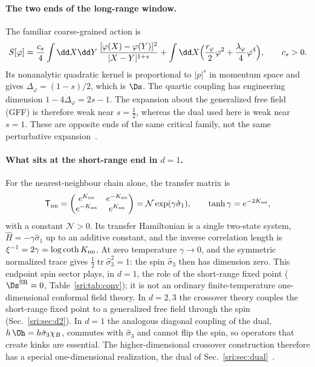 \paragraph{The two ends of the long-range window.} The familiar coarse-grained action is
\begin{equation}
 S[\varphi]=\frac{c_s}{4}\int\dd X\dd Y\,\frac{[\varphi(X)-\varphi(Y)]^2}{|X-Y|^{1+s}}
 +\int\dd X\Bigl(\frac{r_\varphi}{2}\varphi^2+\frac{\lambda_\varphi}{4}\varphi^4\Bigr),\qquad c_s>0.
\end{equation}
Its nonanalytic quadratic kernel is proportional to $|p|^s$ in momentum space and gives $\Delta_\varphi=(1-s)/2$,
which is $\Ds$. The quartic coupling has engineering dimension $1-4\Delta_\varphi=2s-1$. The expansion about the
generalized free field (GFF) is therefore weak near $s=\frac12$, whereas the dual used here is weak near $s=1$. These
are opposite ends of the same critical family, not the same perturbative
expansion~\cite{sri:Benedetti:2025nzp,sri:Benedetti:2020rrq}.

\paragraph{What sits at the short-range end in $d=1$.} For the nearest-neighbour chain alone, the transfer matrix is
\begin{equation}
 \mathsf T_{\rm nn}=\begin{pmatrix}e^{K_{\rm nn}}&e^{-K_{\rm nn}}\\ e^{-K_{\rm nn}}&e^{K_{\rm nn}}\end{pmatrix}
 =\mathcal N\exp(\gamma\hat\sigma_1),\qquad \tanh\gamma=e^{-2K_{\rm nn}},
\end{equation}
with a constant $\mathcal N>0$. Its transfer Hamiltonian is a single two-state system, $\hat H=-\gamma\hat\sigma_1$ up
to an additive constant, and the inverse correlation length is $\xi^{-1}=2\gamma=\log\coth K_{\rm nn}$. At zero
temperature $\gamma\to0$, and the symmetric normalized trace gives $\frac12\operatorname{tr}\hat\sigma_3^2=1$: the
spin $\hat\sigma_3$ then has dimension zero. This endpoint spin sector plays, in $d=1$, the role of the
short-range fixed point ($\Ds^{\rm SR}=0$, Table~\ref{sri:tab:conv}); it is not an ordinary finite-temperature
one-dimensional conformal field theory. In $d=2,3$ the crossover theory couples the short-range fixed point to a
generalized free field through the spin (Sec.~\ref{sri:sec:d2}). In $d=1$ the analogous diagonal coupling
of the dual, $h\,\Oh=h\hat\sigma_3\chi_B$, commutes with $\hat\sigma_3$ and cannot flip the spin, so operators that create kinks are
essential. The higher-dimensional crossover construction therefore has a special one-dimensional realization, the
dual of Sec.~\ref{sri:sec:dual}~\cite{sri:Benedetti:2025nzp,sri:Behan:2017dwr,sri:Behan:2017emf}.

